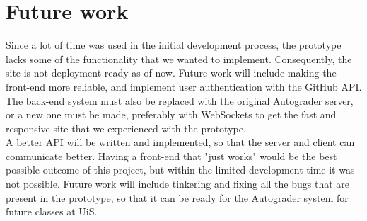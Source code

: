 \section{Future work}
Since a lot of time was used in the initial development process, the prototype lacks some of the functionality that we wanted to implement. Consequently, the site is not deployment-ready as of now. Future work will include making the front-end more reliable, and implement user authentication with the GitHub API. The back-end system must also be replaced with the original Autograder server, or a new one must be made, preferably with WebSockets to get the fast and responsive site that we experienced with the prototype.\\A better API will be written and implemented, so that the server and client can communicate better. Having a front-end that "just works" would be the best possible outcome of this project, but within the limited development time it was not possible. Future work will include tinkering and fixing all the bugs that are present in the prototype, so that it can be ready for the Autograder system for future classes at UiS.
